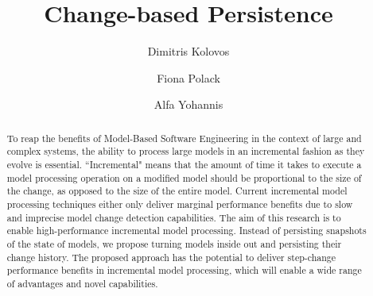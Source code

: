\documentclass{llncs}
\begin{document}
\renewcommand{\thelstlisting}{\thesection.\arabic{lstlisting}}

\title{Change-based Persistence}
%
%
\author{Dimitris Kolovos \and Fiona Polack \and Alfa Yohannis}
%
%
%

\maketitle              %

\begin{abstract}
To reap the benefits of Model-Based Software Engineering in the context of large and complex systems, the ability to process large models in an incremental fashion as they evolve is essential. ``Incremental" means that the amount of time it takes to execute a model processing operation on a modified model should be proportional to the size of the change, as opposed to the size of the entire model. Current incremental model processing techniques either only deliver marginal performance benefits due to slow and imprecise model change detection capabilities. The aim of this research is to enable high-performance incremental model processing. Instead of persisting snapshots of the state of models, we propose turning models inside out and persisting their change history. The proposed approach has the potential to deliver step-change performance benefits in incremental model processing, which will enable a wide range of advantages and novel capabilities.
\end{abstract}
\end{document}
